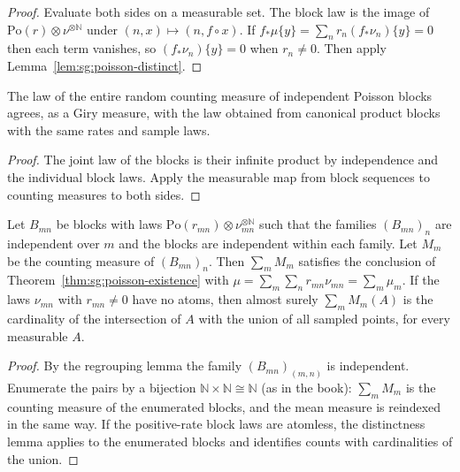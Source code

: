 \begin{proof}
  \leanok
{}
Evaluate both sides on a measurable set. The block law is the image of $\mathrm{Po}(r)\otimes\nu^{\otimes\mathbb N}$ under $(n,x)\mapsto(n,f\circ x)$. If $f_*\mu\{y\}=\sum_nr_n(f_*\nu_n)\{y\}=0$ then each term vanishes, so $(f_*\nu_n)\{y\}=0$ when $r_n\ne0$. Then apply Lemma~\ref{lem:sg:poisson-distinct}.
\end{proof}

\begin{lemma}\label{lem:sg:poisson-canonical-law}
  \leanok
The law of the entire random counting measure of independent Poisson blocks agrees, as a Giry measure, with the law obtained from canonical product blocks with the same rates and sample laws.
\end{lemma}
\begin{proof}
The joint law of the blocks is their infinite product by independence and the individual block laws. Apply the measurable map from block sequences to counting measures to both sides.
\end{proof}

\begin{theorem}\label{thm:sg:poisson-superposition}
  \leanok
Let $B_{mn}$ be blocks with laws $\mathrm{Po}(r_{mn})\otimes\nu_{mn}^{\otimes\mathbb N}$ such that the families $(B_{mn})_n$ are independent over $m$ and the blocks are independent within each family. Let $M_m$ be the counting measure of $(B_{mn})_n$. Then $\sum_mM_m$ satisfies the conclusion of Theorem~\ref{thm:sg:poisson-existence} with $\mu=\sum_m\sum_nr_{mn}\nu_{mn}=\sum_m\mu_m$. If the laws $\nu_{mn}$ with $r_{mn}\ne0$ have no atoms, then almost surely $\sum_mM_m(A)$ is the cardinality of the intersection of $A$ with the union of all sampled points, for every measurable $A$.
\end{theorem}

\begin{proof}
  \leanok
{}
By the regrouping lemma the family $(B_{mn})_{(m,n)}$ is independent. Enumerate the pairs by a bijection $\mathbb N\times\mathbb N\cong\mathbb N$ (as in the book): $\sum_mM_m$ is the counting measure of the enumerated blocks, and the mean measure is reindexed in the same way. If the positive-rate block laws are atomless, the distinctness lemma applies to the enumerated blocks and identifies counts with cardinalities of the union.
\end{proof}

